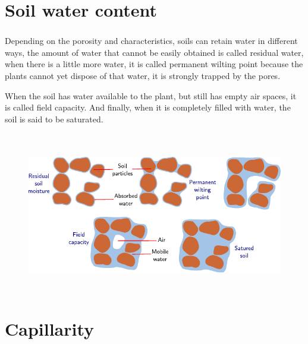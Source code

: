 \section{Soil water content} %
\begin{frame}
	\frametitle{\secname}
	Depending on the porosity and characteristics, soils can retain water in different ways, the amount of water that cannot be easily obtained is called residual water, when there is a little more water, it is called permanent wilting point because the plants cannot yet dispose of that water, it is strongly trapped by the pores.

When the soil has water available to the plant, but still has empty air spaces, it is called field capacity. And finally, when it is completely filled with water, the soil is said to be saturated.

\end{frame}
\begin{frame}
	\frametitle{\secname}
	\begin{figure}[ht!]
		\centering
		\includegraphics[height=6.8cm]{wetness}
	\end{figure}
\end{frame}

\section{Capillarity}


